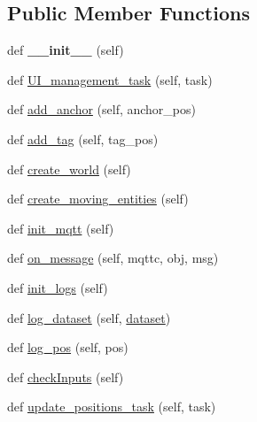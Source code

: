 \subsection*{Public Member Functions}
\begin{DoxyCompactItemize}
\item 
\mbox{\label{classapplication_1_1_application_ae64f0875afe3067b97ba370b354b9213}} 
def {\bfseries \+\_\+\+\_\+init\+\_\+\+\_\+} (self)
\item 
def \mbox{\hyperlink{classapplication_1_1_application_a723c0a1022badcd24965be09a1ccad83}{U\+I\+\_\+management\+\_\+task}} (self, task)
\item 
def \mbox{\hyperlink{classapplication_1_1_application_a919e7c637c4e2c70b80ea71ff708e0c5}{add\+\_\+anchor}} (self, anchor\+\_\+pos)
\item 
def \mbox{\hyperlink{classapplication_1_1_application_afb149cfcea0378638df7b16662fb4516}{add\+\_\+tag}} (self, tag\+\_\+pos)
\item 
def \mbox{\hyperlink{classapplication_1_1_application_a44b040db1450b3e52875b18bf3c397ab}{create\+\_\+world}} (self)
\item 
def \mbox{\hyperlink{classapplication_1_1_application_abd46271df4663c0a6eafd65cc0225619}{create\+\_\+moving\+\_\+entities}} (self)
\item 
def \mbox{\hyperlink{classapplication_1_1_application_a5d5f203a22d435fe3ba8f20a98912951}{init\+\_\+mqtt}} (self)
\item 
def \mbox{\hyperlink{classapplication_1_1_application_ac8badcf7fda4f70c2c93bfe0e55edcb3}{on\+\_\+message}} (self, mqttc, obj, msg)
\item 
def \mbox{\hyperlink{classapplication_1_1_application_a875504ef90230b137861e39cc7ba6c7f}{init\+\_\+logs}} (self)
\item 
def \mbox{\hyperlink{classapplication_1_1_application_a9748ebedda92b7e9328841d6633080b6}{log\+\_\+dataset}} (self, \mbox{\hyperlink{classjson_structures_1_1dataset}{dataset}})
\item 
def \mbox{\hyperlink{classapplication_1_1_application_a976549ccc76753bc31f99185a789a595}{log\+\_\+pos}} (self, pos)
\item 
def \mbox{\hyperlink{classapplication_1_1_application_a5532bf93412434e87215e5dba8f0c366}{check\+Inputs}} (self)
\item 
def \mbox{\hyperlink{classapplication_1_1_application_a87078a437ca2d9fb5c7c7e3f3f964d7b}{update\+\_\+positions\+\_\+task}} (self, task)

\end{DoxyCompactItemize}
